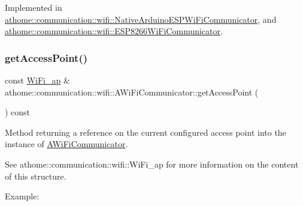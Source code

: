 Implemented in \mbox{\hyperlink{classathome_1_1communication_1_1wifi_1_1_native_arduino_e_s_p_wi_fi_communicator_a3787e850d48d149ee1392ebfb2920bb3}{athome\+::communication\+::wifi\+::\+Native\+Arduino\+E\+S\+P\+Wi\+Fi\+Communicator}}, and \mbox{\hyperlink{classathome_1_1communication_1_1wifi_1_1_e_s_p8266_wi_fi_communicator_a7e53e10b858aebc5e7c6c0ea6007f84a}{athome\+::communication\+::wifi\+::\+E\+S\+P8266\+Wi\+Fi\+Communicator}}.

\mbox{\label{classathome_1_1communication_1_1wifi_1_1_a_wi_fi_communicator_abef86486512e4a39d61df3b27effcc87}} 
\subsubsection{\texorpdfstring{get\+Access\+Point()}{getAccessPoint()}}
{\footnotesize\ttfamily const \mbox{\hyperlink{structathome_1_1communication_1_1wifi_1_1s__wifi__access__point}{Wi\+Fi\+\_\+ap}} \& athome\+::communication\+::wifi\+::\+A\+Wi\+Fi\+Communicator\+::get\+Access\+Point (\begin{DoxyParamCaption}{ }\end{DoxyParamCaption}) const}

Method returning a reference on the current configured access point into the instance of \mbox{\hyperlink{classathome_1_1communication_1_1wifi_1_1_a_wi_fi_communicator}{A\+Wi\+Fi\+Communicator}}.

See athome\+::communication\+::wifi\+::\+Wi\+Fi\+\_\+ap for more information on the content of this structure.

Example\+:


